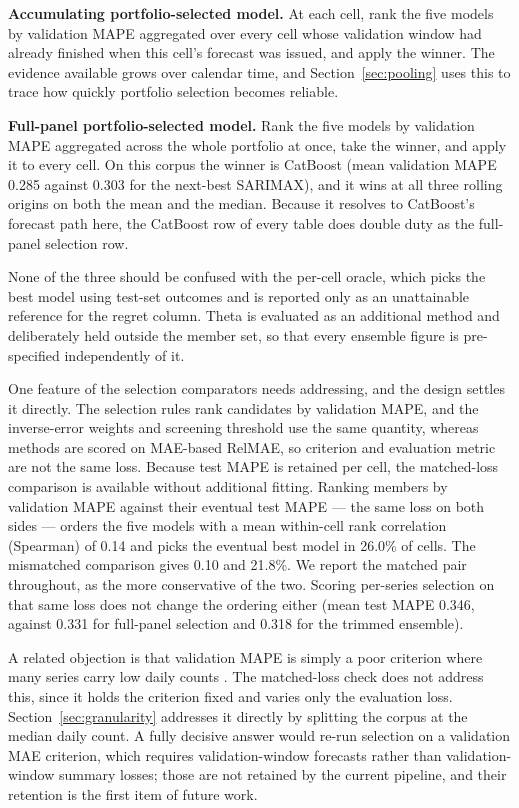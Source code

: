 \documentclass[11pt]{article}
\begin{document}
\textbf{Accumulating portfolio-selected model.} At each cell, rank the five models by validation MAPE aggregated over every cell whose validation window had already finished when this cell's forecast was issued, and apply the winner. The evidence available grows over calendar time, and Section~\ref{sec:pooling} uses this to trace how quickly portfolio selection becomes reliable.

\textbf{Full-panel portfolio-selected model.} Rank the five models by validation MAPE aggregated across the whole portfolio at once, take the winner, and apply it to every cell. On this corpus the winner is CatBoost (mean validation MAPE 0.285 against 0.303 for the next-best SARIMAX), and it wins at all three rolling origins on both the mean and the median. Because it resolves to CatBoost's forecast path here, the CatBoost row of every table does double duty as the full-panel selection row.

None of the three should be confused with the per-cell oracle, which picks the best model using test-set outcomes and is reported only as an unattainable reference for the regret column. Theta is evaluated as an additional method and deliberately held outside the member set, so that every ensemble figure is pre-specified independently of it.

One feature of the selection comparators needs addressing, and the design settles it directly. The selection rules rank candidates by validation MAPE, and the inverse-error weights and screening threshold use the same quantity, whereas methods are scored on MAE-based RelMAE, so criterion and evaluation metric are not the same loss. Because test MAPE is retained per cell, the matched-loss comparison is available without additional fitting. Ranking members by validation MAPE against their eventual test MAPE --- the same loss on both sides --- orders the five models with a mean within-cell rank correlation (Spearman) of 0.14 and picks the eventual best model in 26.0\% of cells. The mismatched comparison gives 0.10 and 21.8\%. We report the matched pair throughout, as the more conservative of the two. Scoring per-series selection on that same loss does not change the ordering either (mean test MAPE 0.346, against 0.331 for full-panel selection and 0.318 for the trimmed ensemble).

A related objection is that validation MAPE is simply a poor criterion where many series carry low daily counts \citep{kolassa2016}. The matched-loss check does not address this, since it holds the criterion fixed and varies only the evaluation loss. Section~\ref{sec:granularity} addresses it directly by splitting the corpus at the median daily count. A fully decisive answer would re-run selection on a validation MAE criterion, which requires validation-window forecasts rather than validation-window summary losses; those are not retained by the current pipeline, and their retention is the first item of future work.
\end{document}
